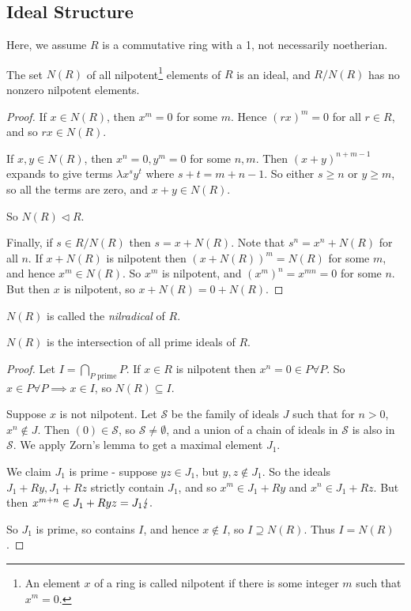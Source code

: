 \documentclass[10pt,a4paper]{article}
\begin{document}
\subsection{Ideal Structure}
Here, we assume $R$ is a commutative ring with a 1, not necessarily noetherian.
\begin{lemma}
  The set $N(R)$ of all nilpotent\footnote{An element $x$ of a ring is called nilpotent if there is some integer $m$ such that $x^m = 0$.} elements of $R$ is an ideal, and $R/N(R)$ has no nonzero nilpotent elements.
\end{lemma}
\begin{proof}
  If $x \in N(R)$, then $x^m = 0$ for some $m$. Hence $(rx)^m = 0$ for all $r \in R$, and so $rx \in N(R)$.

  If $x, y \in N(R)$, then $x^n = 0, y^m = 0$ for some $n, m$. Then $(x+y)^{n+m-1}$ expands to give terms $\lambda x^s y^t$ where $s+t = m+n-1$. So either $s \geq n$ or $y \geq m$, so all the terms are zero, and $x+y \in N(R)$.

  So $N(R) \triangleleft R$.

  Finally, if $s \in R/N(R)$ then $s = x+N(R)$. Note that $s^n = x^n + N(R)$ for all $n$. If $x + N(R)$ is nilpotent then $(x+N(R))^m = N(R)$ for some $m$, and hence $x^m \in N(R)$. So $x^m$ is nilpotent, and $(x^m)^n = x^{mn} = 0$ for some $n$. But then $x$ is nilpotent, so $x+ N(R) = 0 + N(R)$.
\end{proof}
\begin{definition}
  $N(R)$ is called the \emph{nilradical} of $R$.
\end{definition}

\begin{theorem}[Krull]
  $N(R)$ is the intersection of all prime ideals of $R$.
\end{theorem}
\begin{proof}
  Let $I = \bigcap_{P\text{ prime}} P$. If $x \in R$ is nilpotent then $x^n = 0 \in P \forall P$. So $x \in P \forall P \implies x \in I$, so $N(R) \subseteq I$.

  Suppose $x$ is not nilpotent. Let $\mathscr{S}$ be the family of ideals $J$ such that for $n > 0$, $x^n \notin J$. Then $(0) \in \mathscr{S}$, so $\mathscr{S} \neq \emptyset$, and a union of a chain of ideals in $\mathscr{S}$ is also in $\mathscr{S}$. We apply Zorn's lemma to get a maximal element $J_1$.

  We claim $J_1$ is prime - suppose $yz \in J_1$, but $y, z \notin J_1$. So the ideals $J_1 + Ry, J_1 + Rz$ strictly contain $J_1$, and so $x^m  \in J_1+Ry$ and $x^n  \in J_1 + Rz$. But then $x^{m+n} \in J_1 + Ryz = J_1 \lightning.$

  So $J_1$ is prime, so contains $I$, and hence $x \notin I$, so $I \supseteq N(R)$. Thus $I = N(R)$.
\end{proof}
\end{document}
